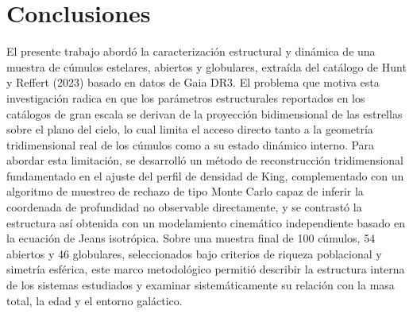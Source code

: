 
\chapter{Conclusiones}
\label{cap:conclusiones}

    El presente trabajo abordó la caracterización estructural y dinámica de una 
    muestra de cúmulos estelares, abiertos y globulares, extraída del catálogo 
    de Hunt y Reffert (2023) basado en datos de Gaia DR3. El problema que 
    motiva esta investigación radica en que los parámetros estructurales 
    reportados en los catálogos de gran escala se derivan de la proyección 
    bidimensional de las estrellas sobre el plano del cielo, lo cual limita el 
    acceso directo tanto a la geometría tridimensional real de los cúmulos como 
    a su estado dinámico interno. Para abordar esta limitación, se desarrolló un 
    método de reconstrucción tridimensional fundamentado en el ajuste del perfil 
    de densidad de King, complementado con un algoritmo de muestreo de rechazo 
    de tipo Monte Carlo capaz de inferir la coordenada de profundidad no 
    observable directamente, y se contrastó la estructura así obtenida con un 
    modelamiento cinemático independiente basado en la ecuación de Jeans 
    isotrópica. Sobre una muestra final de 100 cúmulos, 54 abiertos y 46 
    globulares, seleccionados bajo criterios de riqueza poblacional y simetría 
    esférica, este marco metodológico permitió describir la estructura interna 
    de los sistemas estudiados y examinar sistemáticamente su relación con la 
    masa total, la edad y el entorno galáctico.

